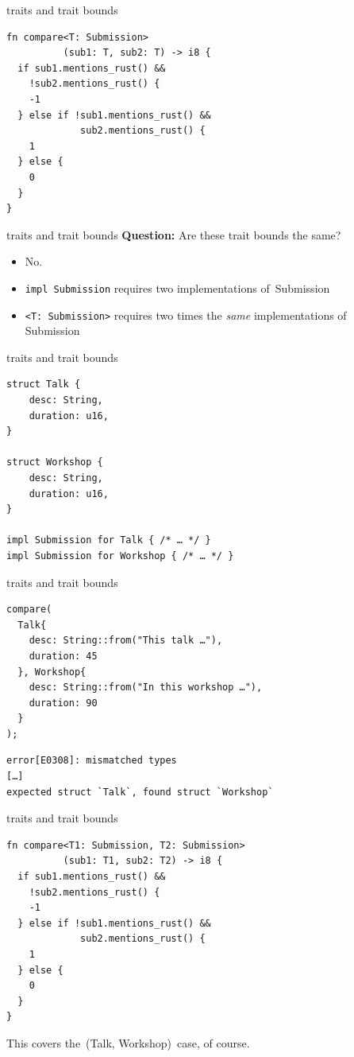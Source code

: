 \documentclass{beamer}
\newcommand\code[1]{\,{\color[HTML]{884400}#1}\,}
\begin{document}
\begin{frame}[fragile]{traits and trait bounds}
  \begin{verbatim}
fn compare<T: Submission>
          (sub1: T, sub2: T) -> i8 {
  if sub1.mentions_rust() &&
    !sub2.mentions_rust() {
    -1
  } else if !sub1.mentions_rust() &&
             sub2.mentions_rust() {
    1
  } else {
    0
  }
}
  \end{verbatim}
\end{frame}

\begin{frame}[fragile]{traits and trait bounds}
  \textbf{Question:} Are these trait bounds the same?

  \pause
  \begin{itemize}
    \item No.
    \item \texttt{impl Submission} requires two implementations of \code{Submission}
    \item \texttt{<T: Submission>} requires two times the \emph{same} implementations of \code{Submission}
  \end{itemize}
\end{frame}

\begin{frame}[fragile]{traits and trait bounds}
  \begin{verbatim}
struct Talk {
    desc: String,
    duration: u16,
}

struct Workshop {
    desc: String,
    duration: u16,
}

impl Submission for Talk { /* … */ }
impl Submission for Workshop { /* … */ }
  \end{verbatim}
\end{frame}

\begin{frame}[fragile]{traits and trait bounds}
  \begin{verbatim}
compare(
  Talk{
    desc: String::from("This talk …"),
    duration: 45
  }, Workshop{
    desc: String::from("In this workshop …"),
    duration: 90
  }
);
  \end{verbatim}

  \begin{verbatim}
error[E0308]: mismatched types
[…]
expected struct `Talk`, found struct `Workshop`
  \end{verbatim}
\end{frame}

\begin{frame}[fragile]{traits and trait bounds}
  \begin{verbatim}
fn compare<T1: Submission, T2: Submission>
          (sub1: T1, sub2: T2) -> i8 {
  if sub1.mentions_rust() &&
    !sub2.mentions_rust() {
    -1
  } else if !sub1.mentions_rust() &&
             sub2.mentions_rust() {
    1
  } else {
    0
  }
}
  \end{verbatim}
  This covers the \code{(Talk, Workshop)} case, of course.
\end{frame}
\end{document}
